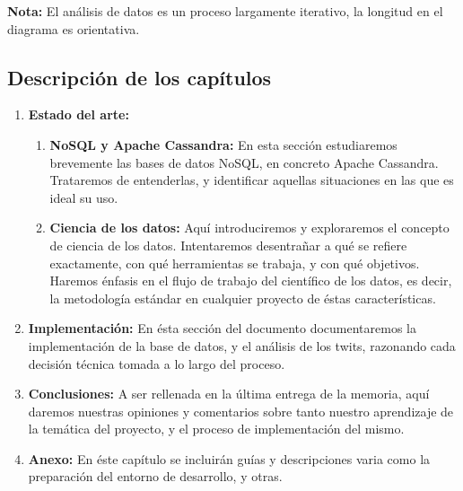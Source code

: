 \begin{center}
  \textbf{Nota: } El análisis de datos es un proceso largamente iterativo, la
  longitud en el diagrama es orientativa.
\end{center}

\vspace{1cm}
\hspace*{-1.3in}

\subsection{Descripción de los capítulos}
\label{subsec:chaps}

\begin{enumerate}
  \item \textbf{Estado del arte: }
    \begin{enumerate}
      \item \textbf{NoSQL y Apache Cassandra: } En esta sección estudiaremos
        brevemente las bases de datos NoSQL, en concreto Apache Cassandra.
        Trataremos de entenderlas, y identificar aquellas situaciones en las que
        es ideal su uso.
      \item \textbf{Ciencia de los datos: } Aquí introduciremos y exploraremos el
        concepto de ciencia de los datos. Intentaremos desentrañar a qué se refiere
        exactamente, con qué herramientas se trabaja, y con qué objetivos.
        Haremos énfasis en el flujo de trabajo del científico de los datos, es
        decir, la metodología estándar en cualquier proyecto de éstas características.
    \end{enumerate}

  \item \textbf{Implementación: } En ésta sección del documento documentaremos
    la implementación de la base de datos, y el análisis de los twits, razonando
    cada decisión técnica tomada a lo largo del proceso.
  \item \textbf{Conclusiones: } A ser rellenada en la última entrega de la
    memoria, aquí daremos nuestras opiniones y comentarios sobre tanto nuestro
    aprendizaje de la temática del proyecto, y el proceso de implementación del mismo.
  \item \textbf{Anexo: } En éste capítulo se incluirán guías y descripciones
    varia como la preparación del entorno de desarrollo, y otras.
\end{enumerate}

